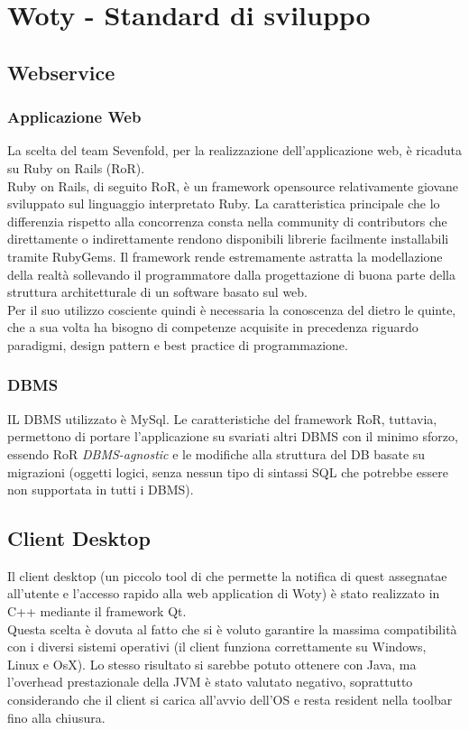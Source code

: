 {{\section{Woty - Standard di sviluppo}

\subsection{Webservice}
\subsubsection{Applicazione Web}
La scelta del team Sevenfold, per la realizzazione dell'applicazione web, è ricaduta su Ruby on Rails (RoR).\\
Ruby on Rails, di seguito RoR, è un framework opensource relativamente giovane sviluppato sul linguaggio interpretato Ruby. La caratteristica principale che lo differenzia rispetto alla concorrenza consta nella community di contributors che direttamente o indirettamente rendono disponibili librerie facilmente installabili tramite RubyGems. Il framework rende estremamente astratta la modellazione della realtà sollevando il programmatore dalla progettazione di buona parte della struttura architetturale di un software basato sul web. 
\\Per il suo utilizzo cosciente quindi è necessaria la conoscenza del dietro le quinte, che a sua volta ha bisogno di competenze acquisite in precedenza riguardo paradigmi, design pattern e best practice di programmazione.
\subsubsection{DBMS}
IL DBMS utilizzato è MySql. Le caratteristiche del framework RoR, tuttavia, permettono di portare l'applicazione su svariati altri DBMS con il minimo sforzo, essendo RoR \emph{DBMS-agnostic} e le modifiche alla struttura del DB basate su migrazioni (oggetti logici, senza nessun tipo di sintassi SQL che potrebbe essere non supportata in tutti i DBMS).

\subsection{Client Desktop}
Il client desktop (un piccolo tool di che permette la notifica di quest assegnatae all'utente e l'accesso rapido alla web application di Woty) è stato realizzato in C++ mediante il framework Qt.\\
Questa scelta è dovuta al fatto che si è voluto garantire la massima compatibilità con i diversi sistemi operativi (il client funziona correttamente su Windows, Linux e OsX). Lo stesso risultato si sarebbe potuto ottenere con Java, ma l'overhead prestazionale della JVM è stato valutato negativo, soprattutto considerando che il client si carica all'avvio dell'OS e resta resident nella toolbar fino alla chiusura. 

}}
